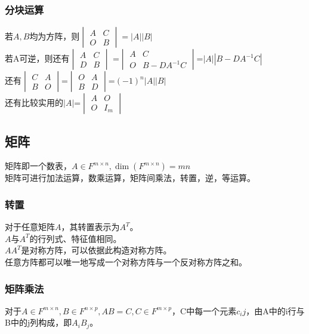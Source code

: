 \documentclass[UTF8]{ctexart}
\begin{document}
\subsubsection{分块运算}
若$A,B$均为方阵，则$\begin{vmatrix} A & C \\ \mathit{O} & B \end{vmatrix}=|A||B|$\\
\indent
若A可逆，则还有$\begin{vmatrix}A&C \\ D&B\end{vmatrix}$ =$\begin{vmatrix}A&C\\\mathit{O}&B-DA^{-1}C \end{vmatrix}$=$|A||B-DA^{-1}C|$\\
\indent
还有$\begin{vmatrix}C&A\\B&\mathit{O}\end{vmatrix}$=$\begin{vmatrix}\mathit{O}&A\\B&D \end{vmatrix}$=$(-1)^{n}|A||B|$\\
\indent
还有比较实用的$|A|$=$\begin{vmatrix}A&\mathit{O}\\\mathit{O}&I_{m}\end{vmatrix}$
\subsection{矩阵}
矩阵即一个数表，$A\in F^{m\times n},\dim(F^{m\times n})=mn$\\
\indent
矩阵可进行加法运算，数乘运算，矩阵间乘法，转置，逆，等运算。
\subsubsection{转置}
对于任意矩阵$A$，其转置表示为$A^{T}$。\\
\indent
$A$与$A^{T}$的行列式、特征值相同。\\
\indent
$AA^{T}$是对称方阵，可以依据此构造对称方阵。\\
\indent
任意方阵都可以唯一地写成一个对称方阵与一个反对称方阵之和。
\subsubsection{矩阵乘法}
对于$A\in F^{m\times n},B\in F^{n\times p},AB=C,C\in F^{m\times p}$，C中每一个元素$c_ij$，由A中的i行与B中的j列构成，即$A_iB_j$。
\end{document}
